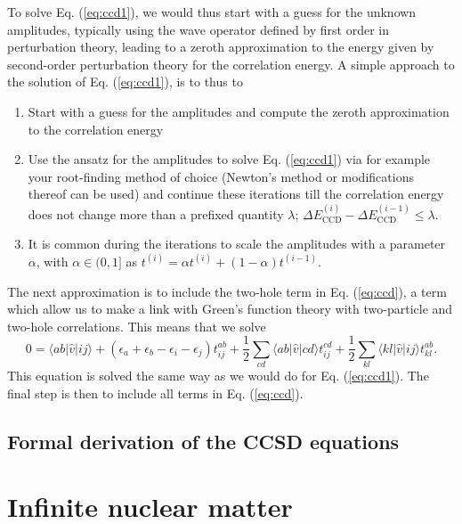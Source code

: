 To solve Eq. (\ref{eq:ccd1}), we would thus start with a guess for the unknown amplitudes, typically using the wave operator defined by first order in perturbation theory, leading to a zeroth approximation to the energy given by second-order perturbation theory for the correlation energy.
A simple approach to the solution of  Eq. (\ref{eq:ccd1}), is to thus to
\begin{enumerate}
\item Start with a guess for the amplitudes and compute the zeroth approximation to the correlation energy

\item Use the ansatz for the amplitudes to solve Eq. (\ref{eq:ccd1}) via for example your root-finding method of choice (Newton's method or modifications thereof can be used) and continue these iterations till the correlation energy does not change more than a prefixed quantity $\lambda$; $\Delta E_{\mathrm{CCD}}^{(i)}-\Delta E_{\mathrm{CCD}}^{(i-1)} \le \lambda$.

\item It is common during the iterations to scale the amplitudes with a parameter $\alpha$, with $\alpha \in (0,1]$ as  $t^{(i)}=\alpha t^{(i)}+(1-\alpha)t^{(i-1)}$.
\end{enumerate}

\noindent
The next approximation is to include the two-hole term in Eq. (\ref{eq:ccd}), a term which allow us to make a link with Green's function theory with two-particle and two-hole correlations. This means that we solve
\begin{equation}
0 = \langle ab \vert \hat{v} \vert ij \rangle + \left(\epsilon_a+\epsilon_b-\epsilon_i-\epsilon_j\right)t_{ij}^{ab}+\frac{1}{2}\sum_{cd} \langle ab \vert \hat{v} \vert cd \rangle t_{ij}^{cd}+\frac{1}{2}\sum_{kl} \langle kl \vert \hat{v} \vert ij \rangle t_{kl}^{ab}.
\label{eq:ccd2}
\end{equation}
This equation is solved the same way as we would do for Eq. (\ref{eq:ccd1}). The final step is then to include all terms in Eq. (\ref{eq:ccd}). 


\subsection{Formal derivation of the CCSD equations}


\section{Infinite nuclear matter}

